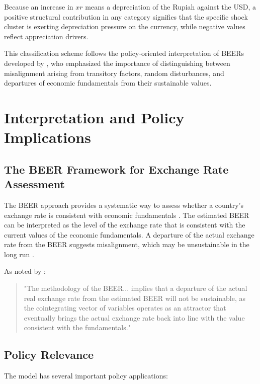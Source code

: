 \documentclass[11pt,a4paper]{article}
\begin{document}
Because an increase in $xr$ means a depreciation of the Rupiah against the USD, a positive structural contribution in any category signifies that the specific shock cluster is exerting depreciation pressure on the currency, while negative values reflect appreciation drivers.

This classification scheme follows the policy-oriented interpretation of BEERs developed by \cite{ClarkMacDonald1998}, who emphasized the importance of distinguishing between misalignment arising from transitory factors, random disturbances, and departures of economic fundamentals from their sustainable values.

\section{Interpretation and Policy Implications}

\subsection{The BEER Framework for Exchange Rate Assessment}

The BEER approach provides a systematic way to assess whether a country's exchange rate is consistent with economic fundamentals \citep{ClarkMacDonald1998}. The estimated BEER can be interpreted as the level of the exchange rate that is consistent with the current values of the economic fundamentals. A departure of the actual exchange rate from the BEER suggests misalignment, which may be unsustainable in the long run \citep{ClarkMacDonald1998}.

As noted by \cite{ClarkMacDonald1998}: 

\begin{quote}
"The methodology of the BEER... implies that a departure of the actual real exchange rate from the estimated BEER will not be sustainable, as the cointegrating vector of variables operates as an attractor that eventually brings the actual exchange rate back into line with the value consistent with the fundamentals."
\end{quote}

\subsection{Policy Relevance}

The model has several important policy applications:
\end{document}
